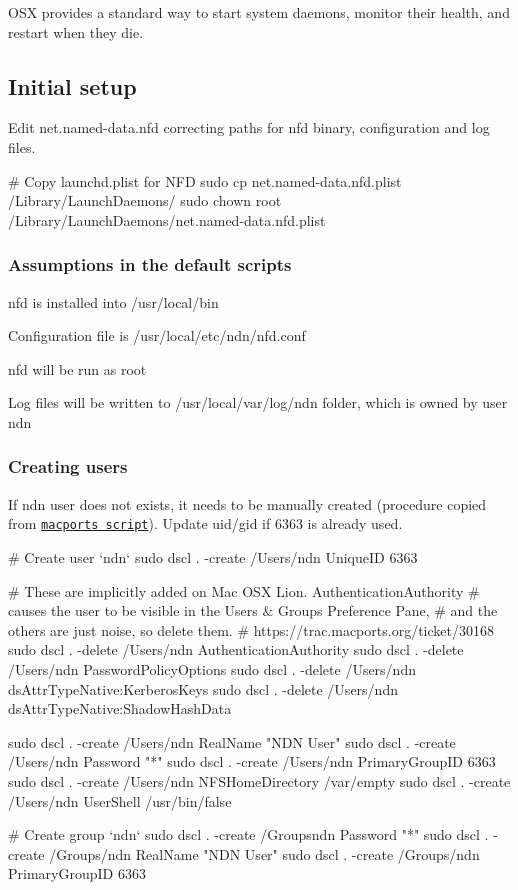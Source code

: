 O\+SX provides a standard way to start system daemons, monitor their health, and restart when they die.

\subsection*{Initial setup }

Edit {\ttfamily net.\+named-\/data.\+nfd} correcting paths for {\ttfamily nfd} binary, configuration and log files. \begin{DoxyVerb}# Copy launchd.plist for NFD
sudo cp net.named-data.nfd.plist /Library/LaunchDaemons/
sudo chown root /Library/LaunchDaemons/net.named-data.nfd.plist
\end{DoxyVerb}


\subsubsection*{Assumptions in the default scripts}


\begin{DoxyItemize}
\item {\ttfamily nfd} is installed into {\ttfamily /usr/local/bin}
\item Configuration file is {\ttfamily /usr/local/etc/ndn/nfd.conf}
\item {\ttfamily nfd} will be run as root
\item Log files will be written to {\ttfamily /usr/local/var/log/ndn} folder, which is owned by user {\ttfamily ndn}
\end{DoxyItemize}

\subsubsection*{Creating users}

If {\ttfamily ndn} user does not exists, it needs to be manually created (procedure copied from \href{https://trac.macports.org/browser/trunk/base/src/port1.0/portutil.tcl}{\tt macports script}). Update uid/gid if 6363 is already used. \begin{DoxyVerb}# Create user `ndn`
sudo dscl . -create /Users/ndn UniqueID 6363

# These are implicitly added on Mac OSX Lion.  AuthenticationAuthority
# causes the user to be visible in the Users & Groups Preference Pane,
# and the others are just noise, so delete them.
# https://trac.macports.org/ticket/30168
sudo dscl . -delete /Users/ndn AuthenticationAuthority
sudo dscl . -delete /Users/ndn PasswordPolicyOptions
sudo dscl . -delete /Users/ndn dsAttrTypeNative:KerberosKeys
sudo dscl . -delete /Users/ndn dsAttrTypeNative:ShadowHashData

sudo dscl . -create /Users/ndn RealName "NDN User"
sudo dscl . -create /Users/ndn Password "{*}"
sudo dscl . -create /Users/ndn PrimaryGroupID 6363
sudo dscl . -create /Users/ndn NFSHomeDirectory /var/empty
sudo dscl . -create /Users/ndn UserShell /usr/bin/false

# Create group `ndn`
sudo dscl . -create /Groupsndn Password "{*}"
sudo dscl . -create /Groups/ndn RealName "NDN User"
sudo dscl . -create /Groups/ndn PrimaryGroupID 6363
\end{DoxyVerb}


